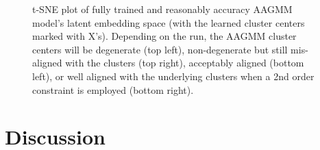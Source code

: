 \documentclass[10pt,twocolumn,letterpaper]{article}
\begin{document}
\begin{figure}[h]
	\caption{t-SNE plot of fully trained and reasonably accuracy AAGMM model's latent embedding space (with the learned cluster centers marked with X's). Depending on the run, the AAGMM cluster centers will be degenerate (top left), non-degenerate but still mis-aligned with the clusters (top right), acceptably aligned (bottom left), or well aligned with the underlying clusters when a 2nd order constraint is employed (bottom right).} 
	\label{fig:cifar10tsneaagmmnone}
\end{figure}




%		



\section{Discussion}
\end{document}
